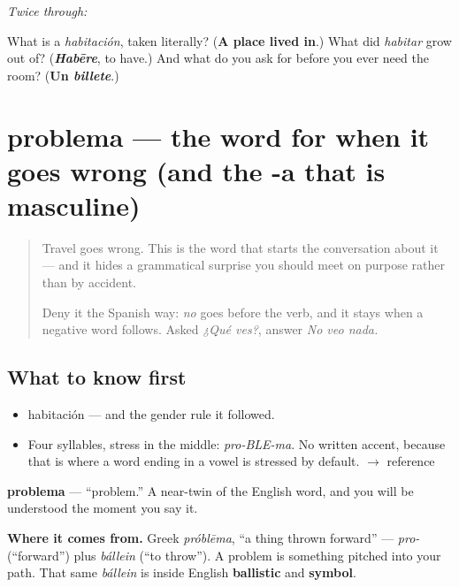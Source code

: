 \emph{Twice through:}

\begin{tcolorbox}[breakable,colback=teal!4,colframe=teal!35!black,title={Before you move on}]
What is a \emph{habitación}, taken literally? (\textbf{A place lived in}.) What did \emph{habitar} grow out of? (\emph{\textbf{Habēre}}, to have.) And what do you ask for before you ever need the room? (\textbf{Un \emph{billete}}.)
\end{tcolorbox}
\section[problema]{problema — the word for when it goes wrong (and the -a that is masculine)}

\label{lesson:ES-C268-problema}



\begin{quote}
Travel goes wrong. This is the word that starts the conversation about it — and it hides a grammatical surprise you should meet on purpose rather than by accident.

Deny it the Spanish way: \emph{no} goes before the verb, and it stays when a negative word follows. Asked \emph{¿Qué ves?}, answer \emph{No veo nada.}
\end{quote}

\subsection*{What to know first}
\begin{itemize}
\raggedright
  \item habitación — and the gender rule it followed.
\end{itemize}

\begin{sounds}
\begin{itemize}
\raggedright
  \item Four syllables, stress in the middle: \emph{pro-BLE-ma}. No written accent, because that is where a word ending in a vowel is stressed by default. $\to$ reference
\end{itemize}
\end{sounds}

\begin{cousinweb}
\textbf{problema} — \textquotedblleft{}problem.\textquotedblright{} A near-twin of the English word, and you will be understood the moment you say it.

\textbf{Where it comes from.} Greek \emph{próblēma}, \textquotedblleft{}a thing thrown forward\textquotedblright{} — \emph{pro-} (\textquotedblleft{}forward\textquotedblright{}) plus \emph{bállein} (\textquotedblleft{}to throw\textquotedblright{}). A problem is something pitched into your path. That same \emph{bállein} is inside English \textbf{ballistic} and \textbf{symbol}.
\end{cousinweb}

